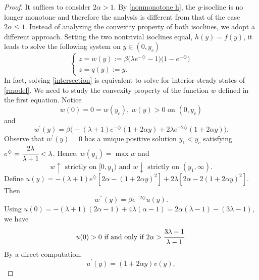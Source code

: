 \documentclass[11pt]{article}
\begin{document}
\begin{proof} It suffices to consider $2\alpha>1$. By \eqref{nonmonotone h}, the
$y$-isocline is no longer monotone and therefore the analysis is
different  from that of the case $2\alpha\leq 1$. Instead of
analyzing the convexity property of both isoclines, we adopt a
different approach. Setting the two nontrivial isoclines equal,
$h(y)=f(y)$, it leads to solve the following system on $y \in (0,
y_c)$
\begin{equation}\label{intersection}\left\{\begin{array}{ll}
z=w(y):=\beta\bigg(\lambda e^{-\diamondsuit}-1\bigg)\bigg(1-e^{-\diamondsuit}\bigg) \\[1ex]
z=q(y):=y.
\end{array}\right.
\end{equation}
 In fact, solving \eqref{intersection} is equivalent to solve for interior steady states of \eqref{rmodel}.
  We need to study the convexity property of the function $w$ defined in the first equation. Notice
\begin{equation}\label{w}
w(0)=0=w(y_c), \ w(y)>0 \mbox{ on }  (0, y_c)
\end{equation}
and
\begin{equation}\label{wprime}
w^\prime(y)=\beta\bigg(-(\lambda+1)e^{-\diamondsuit}(1+2\alpha
y)+2\lambda e^{-2\diamondsuit}(1+2\alpha y)\bigg).
\end{equation}
Observe that $w^\prime(y)=0$ has a unique positive solution $y_1 <y_c$ satisfying $e^{ \diamondsuit}=\cfrac{2\lambda }{\lambda+1} <\lambda$. Hence, $w(y_1)= \max w $ and
\begin{equation}\label{y1}
w \uparrow  \mbox{ strictly on }[0, y_1) \mbox{ and } w \downarrow   \mbox{ strictly on } (y_1, \infty).
\end{equation}
Define $u(y)=-(\lambda+1)e^\diamondsuit[2\alpha-(1+2\alpha
y)^2]+2\lambda[2\alpha-2(1+2\alpha y)^2]$. Then
 \begin{equation}\label{wprimeprime}
w^{\prime\prime}(y)=\beta e^{-2\diamondsuit} u(y).
\end{equation}
Using  $u(0)=-(\lambda+1)(2\alpha-1)+4\lambda(\alpha-1) =2\alpha
(\lambda-1)-(3\lambda-1)$, we have
\begin{equation}\label{u0}
u(0)>  0 \mbox{ if and only if } 2\alpha >
\cfrac{3\lambda-1}{\lambda-1}.
\end{equation}
 By a direct computation,
 \begin{equation}\label{uprime}
 u^\prime(y)=(1+2\alpha y)v(y),
 \end{equation}

\end{proof}
\end{document}
